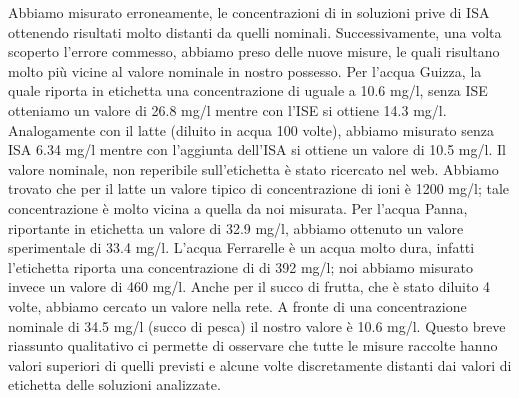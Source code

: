 Abbiamo misurato erroneamente, le concentrazioni di  in soluzioni prive di ISA ottenendo risultati molto distanti da quelli nominali.
Successivamente, una volta scoperto l'errore commesso, abbiamo preso delle nuove misure, le quali risultano molto più vicine al valore nominale in nostro possesso.
Per l'acqua Guizza, la quale riporta in etichetta una concentrazione di  uguale a 10.6 mg/l, senza ISE otteniamo un valore di 26.8 mg/l mentre con l'ISE si ottiene 14.3 mg/l.
Analogamente con il latte (diluito in acqua 100 volte), abbiamo misurato senza ISA 6.34 mg/l mentre con l'aggiunta dell'ISA si ottiene un valore di 10.5 mg/l.
Il valore nominale, non reperibile sull'etichetta è stato ricercato nel web.
Abbiamo trovato che per il latte un valore tipico di concentrazione di ioni  è 1200 mg/l; tale concentrazione è molto vicina a quella da noi misurata.
Per l'acqua Panna, riportante in etichetta un valore di 32.9 mg/l, abbiamo ottenuto un valore sperimentale di 33.4 mg/l.
L'acqua Ferrarelle è un acqua molto dura, infatti l'etichetta riporta una concentrazione di  di 392 mg/l; noi abbiamo misurato invece un valore di 460 mg/l.
Anche per il succo di frutta, che è stato diluito 4 volte, abbiamo cercato un valore nella rete. A fronte di una concentrazione nominale di 34.5 mg/l (succo di pesca) il nostro valore è 10.6 mg/l.
Questo breve riassunto qualitativo ci permette di osservare che tutte le misure raccolte hanno valori superiori di quelli previsti e alcune volte discretamente distanti dai valori di etichetta delle soluzioni analizzate.

